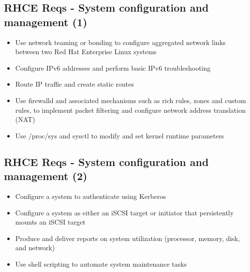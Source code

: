 \documentclass[letterpaper,10pt,english]{sphinxmanual}
\begin{document}
\subsection{RHCE Reqs - System configuration and management (1)}
\label{rhce:rhce-reqs-system-configuration-and-management-1}\begin{itemize}
\item {} 
Use network teaming or bonding to configure aggregated network links between two Red Hat Enterprise Linux systems

\item {} 
Configure IPv6 addresses and perform basic IPv6 troubleshooting

\item {} 
Route IP traffic and create static routes

\item {} 
Use firewalld and associated mechanisms such as rich rules, zones and custom rules, to implement packet filtering and configure network address translation (NAT)

\item {} 
Use /proc/sys and sysctl to modify and set kernel runtime parameters

\end{itemize}


\subsection{RHCE Reqs - System configuration and management (2)}
\label{rhce:rhce-reqs-system-configuration-and-management-2}\begin{itemize}
\item {} 
Configure a system to authenticate using Kerberos

\item {} 
Configure a system as either an iSCSI target or initiator that persistently mounts an iSCSI target

\item {} 
Produce and deliver reports on system utilization (processor, memory, disk, and network)

\item {} 
Use shell scripting to automate system maintenance tasks

\end{itemize}
\end{document}
